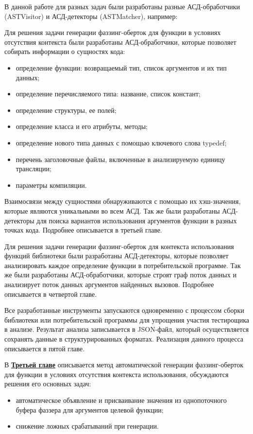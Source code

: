 В данной работе для разных задач были разработаны разные АСД-обработчики (ASTVisitor) и АСД-детекторы (ASTMatcher), например:

Для решения задачи генерации фаззинг-оберток для функции в условиях отсутствия контекста были разработаны АСД-обработчики, которые позволяет собирать информации о сущностях кода:
\begin{itemize}
    \item определение функции: возвращаемый тип, список аргументов и их тип данных;
    \item определение перечисляемого типа: название, список констант;
    \item определение структуры, ее полей;
    \item определение класса и его атрибуты, методы;
    \item определение нового типа данных с помощью ключевого слова typedef;
    \item перечень заголовочные файлы, включенные в анализируемую единицу трансляции;
    \item параметры компиляции.
\end{itemize}
Взаимосвязи  между сущностями обнаруживаются с помощью их хэш-значения, которые являются уникальными во всем АСД.
Так же были разработаны АСД-детекторы для поиска вариантов использования аргументов функции в разных точках кода. Подробнее описывается в третьей главе.

Для решения задачи генерации фаззинг-оберток для контекста использования функций библиотеки были разработаны АСД-детекторы, которые позволяет анализировать каждое определение функции в потребительской программе. Так же были разработаны АСД-обработчики, которые строят граф поток данных и анализирует поток данных аргументов найденных вызовов. Подробнее описывается в четвертой главе.

Все разработанные инструменты запускаются одновременно с процессом сборки библиотеки или потребительской программы для упрощения участия тестирощика в анализе. Результат анализа записывается в JSON-файл, который осуществляется сохранять данные в структурированных форматах. Реализация данного процесса описывается в пятой главе.

В \underline{\textbf{Третьей главе}} описывается метод автоматической генерации фаззинг-оберток для функции в условиях отсутствия контекста использования, обсуждаются решения его основных задач:
\begin{itemize}
\item автоматическое объявление и присваивание значения из однопоточного буфера фаззера для аргументов целевой функции;
\item снижение ложных срабатываний при генерации.
\end{itemize}

